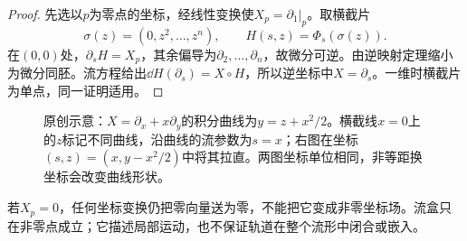 \begin{proof}
先选以$p$为零点的坐标，经线性变换使$X_p=\partial_1|_p$。取横截片
\[
 \sigma(z)=(0,z^2,\ldots,z^n),\qquad H(s,z)=\Phi_s(\sigma(z)).
\]
在$(0,0)$处，$\partial_sH=X_p$，其余偏导为$\partial_2,\ldots,\partial_n$，故微分可逆。由逆映射定理缩小为微分同胚。流方程给出$\dd H(\partial_s)=X\circ H$，所以逆坐标中$X=\partial_s$。一维时横截片为单点，同一证明适用。
\end{proof}
\begin{figure}[htbp]
\centering
\caption{原创示意：$X=\partial_x+x\partial_y$的积分曲线为$y=z+x^2/2$。横截线$x=0$上的$z$标记不同曲线，沿曲线的流参数为$s=x$；右图在坐标$(s,z)=(x,y-x^2/2)$中将其拉直。两图坐标单位相同，非等距换坐标会改变曲线形状。}
\label{fig:flow-box}
\end{figure}
若$X_p=0$，任何坐标变换仍把零向量送为零，不能把它变成非零坐标场。流盒只在非零点成立；它描述局部运动，也不保证轨道在整个流形中闭合或嵌入。
